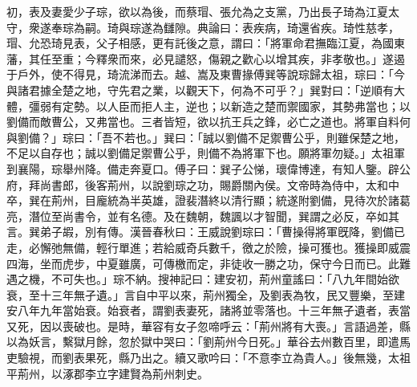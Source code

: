 \begin{pinyinscope}
初，表及妻愛少子琮，欲以為後，而蔡瑁、張允為之支黨，乃出長子琦為江夏太守，衆遂奉琮為嗣。琦與琮遂為讎隙。典論曰：表疾病，琦還省疾。琦性慈孝，瑁、允恐琦見表，父子相感，更有託後之意，謂曰：「將軍命君撫臨江夏，為國東藩，其任至重；今釋衆而來，必見譴怒，傷親之歡心以增其疾，非孝敬也。」遂遏于戶外，使不得見，琦流涕而去。越、嵩及東曹掾傅巽等說琮歸太祖，琮曰：「今與諸君據全楚之地，守先君之業，以觀天下，何為不可乎？」巽對曰：「逆順有大體，彊弱有定勢。以人臣而拒人主，逆也；以新造之楚而禦國家，其勢弗當也；以劉備而敵曹公，又弗當也。三者皆短，欲以抗王兵之鋒，必亡之道也。將軍自料何與劉備？」琮曰：「吾不若也。」巽曰：「誠以劉備不足禦曹公乎，則雖保楚之地，不足以自存也；誠以劉備足禦曹公乎，則備不為將軍下也。願將軍勿疑。」太祖軍到襄陽，琮舉州降。備走奔夏口。傅子曰：巽子公悌，瓌偉博達，有知人鑒。辟公府，拜尚書郎，後客荊州，以說劉琮之功，賜爵關內侯。文帝時為侍中，太和中卒，巽在荊州，目龐統為半英雄，證裴潛終以清行顯；統遂附劉備，見待次於諸葛亮，潛位至尚書令，並有名德。及在魏朝，魏諷以才智聞，巽謂之必反，卒如其言。巽弟子嘏，別有傳。漢晉春秋曰：王威說劉琮曰：「曹操得將軍旣降，劉備已走，必懈弛無備，輕行單進；若給威奇兵數千，徼之於險，操可獲也。獲操即威震四海，坐而虎步，中夏雖廣，可傳檄而定，非徒收一勝之功，保守今日而已。此難遇之機，不可失也。」琮不納。搜神記曰：建安初，荊州童謠曰：「八九年間始欲衰，至十三年無孑遺。」言自中平以來，荊州獨全，及劉表為牧，民又豐樂，至建安八年九年當始衰。始衰者，謂劉表妻死，諸將並零落也。十三年無孑遺者，表當又死，因以喪破也。是時，華容有女子忽啼呼云：「荊州將有大喪。」言語過差，縣以為妖言，繫獄月餘，忽於獄中哭曰：「劉荊州今日死。」華谷去州數百里，即遣馬吏驗視，而劉表果死，縣乃出之。續又歌吟曰：「不意李立為貴人。」後無幾，太祖平荊州，以涿郡李立字建賢為荊州刺史。


\end{pinyinscope}
